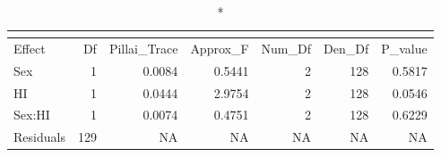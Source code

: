 \begin{longtable}{lrrrrrr}
\caption*{
{\large }
} \\ 
\toprule
Effect & Df & Pillai\_Trace & Approx\_F & Num\_Df & Den\_Df & P\_value \\ 
\midrule\addlinespace[2.5pt]
Sex & 1 & 0.0084 & 0.5441 & 2 & 128 & 0.5817 \\ 
HI & 1 & 0.0444 & 2.9754 & 2 & 128 & 0.0546 \\ 
Sex:HI & 1 & 0.0074 & 0.4751 & 2 & 128 & 0.6229 \\ 
Residuals & 129 & NA & NA & NA & NA & NA \\ 
\bottomrule
\end{longtable}

